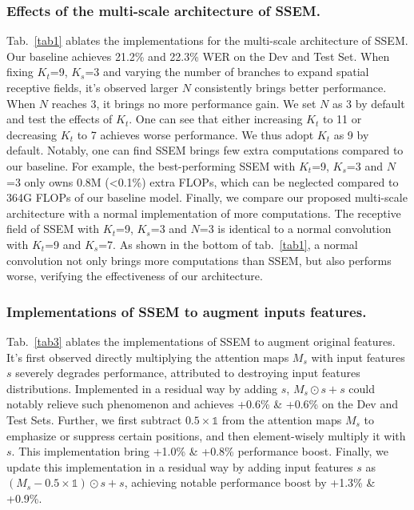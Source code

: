 \documentclass[letterpaper]{article} \usepackage{aaai23}  \usepackage{times}  \usepackage{helvet}  \usepackage{courier}  \usepackage[hyphens]{url}  \usepackage{graphicx} \urlstyle{rm} \def\UrlFont{\rm}  \usepackage{natbib}  \usepackage{caption} \frenchspacing  \setlength{\pdfpagewidth}{8.5in} \setlength{\pdfpageheight}{11in} \usepackage{algorithm}
\begin{document}
\subsubsection{Effects of the multi-scale architecture of SSEM.}
Tab.~\ref{tab1} ablates the implementations for the multi-scale architecture of SSEM. Our baseline achieves 21.2\% and 22.3\% WER on the Dev and Test Set. When fixing $K_t$=9, $K_s$=3 and varying the number of branches to expand spatial receptive fields, it's observed larger $N$ consistently brings better performance. When $N$ reaches 3, it brings no more performance gain. We set $N$ as 3 by default and test the effects of $K_t$. One can see that either increasing $K_t$ to 11 or decreasing $K_t$ to 7 achieves worse performance. We thus adopt $K_t$ as 9 by default. Notably, one can find SSEM brings few extra computations compared to our baseline. For example, the best-performing SSEM with $K_t$=9, $K_s$=3 and $N$=3 only owns 0.8M (\textless 0.1\%) extra FLOPs, which can be neglected compared to 364G FLOPs of our baseline model. Finally, we compare our proposed multi-scale architecture with a normal implementation of more computations. The receptive field of SSEM with $K_t$=9, $K_s$=3 and $N$=3 is identical to a normal convolution with $K_t$=9 and $K_s$=7. As shown in the bottom of tab.~\ref{tab1}, a normal convolution not only brings more computations than SSEM, but also performs worse, verifying the effectiveness of our architecture. 

\subsubsection{Implementations of SSEM to augment inputs features.} Tab.~\ref{tab3} ablates the implementations of SSEM to augment original features. It's first observed directly multiplying the attention maps $M_s$ with input features $s$ severely degrades performance, attributed to destroying input features distributions. Implemented in a residual way by adding $s$, $M_s \odot s + s$ could notably relieve such phenomenon and achieves +0.6\% \& +0.6\% on the Dev and Test Sets. Further, we first subtract $0.5\times \mathds{1}$ from the attention maps $M_s$ to emphasize or suppress certain positions, and then element-wisely multiply it with $s$. This implementation bring +1.0\% \& +0.8\% performance boost. Finally, we update this implementation in a residual way by adding input features $s$ as $(M_s -0.5\times \mathds{1}) \odot s +s $, achieving notable performance boost by +1.3\% \& +0.9\%.
\end{document}
